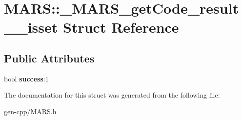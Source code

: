\hypertarget{structMARS_1_1__MARS__getCode__result____isset}{}\section{M\+A\+RS\+:\+:\+\_\+\+M\+A\+R\+S\+\_\+get\+Code\+\_\+result\+\_\+\+\_\+isset Struct Reference}
\label{structMARS_1_1__MARS__getCode__result____isset}
\subsection*{Public Attributes}
\begin{DoxyCompactItemize}
\item 
\mbox{\label{structMARS_1_1__MARS__getCode__result____isset_abe6ea45e4c9488889440397a8cdc1961}} 
bool {\bfseries success}\+:1
\end{DoxyCompactItemize}


The documentation for this struct was generated from the following file\+:\begin{DoxyCompactItemize}
\item 
gen-\/cpp/M\+A\+R\+S.\+h\end{DoxyCompactItemize}
